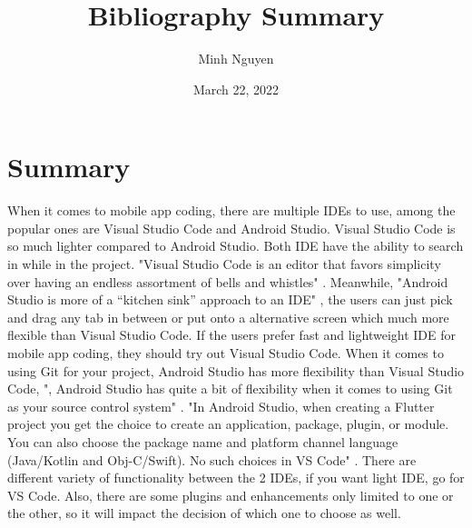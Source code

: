 \documentclass{article}
\title{Bibliography Summary}
\author{Minh Nguyen}
\date{March 22, 2022}
\begin{document}
\maketitle

\section*{Summary}
When it comes to mobile app coding, there are multiple IDEs to use, among the popular ones are Visual Studio Code and Android Studio. Visual Studio Code is so much lighter compared to Android Studio. Both IDE have the ability to search in while in the project. "Visual Studio Code is an editor that favors simplicity over having an endless assortment of bells and whistles" \cite{Lewis22}. Meanwhile, "Android Studio is more of a “kitchen sink” approach to an IDE" \cite{Lewis22}, the users can just pick and drag any tab in between or put onto a alternative screen which much more flexible than Visual Studio Code. If the users prefer fast and lightweight IDE for mobile app coding, they should try out Visual Studio Code. When it comes to using Git for your project, Android Studio has more flexibility than Visual Studio Code, ", Android Studio has quite a bit of flexibility when it comes to using Git as your source control system" \cite{Lewis22}. "In Android Studio, when creating a Flutter project you get the choice to create an application, package, plugin, or module. You can also choose the package name and platform channel language (Java/Kotlin and Obj-C/Swift). No such choices in VS Code" \cite{Suragch20}. There are different variety of functionality between the 2 IDEs, if you want light IDE, go for VS Code. Also, there are some plugins and enhancements only limited to one or the other, so it will impact the decision of which one to choose as well. \cite{Suragch20}




\printbibliography
\end{document}
